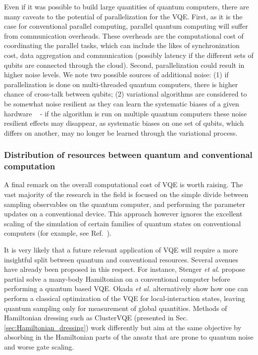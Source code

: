 Even if it was possible to build large quantities of quantum computers, there are many caveats to the potential of parallelization for the VQE. First, as it is the case for conventional parallel computing, parallel quantum computing will suffer from communication overheads. These overheads are the computational cost of coordinating the parallel tasks, which can include the likes of synchronization cost, data aggregation and communication (possibly latency if the different sets of qubits are connected through the cloud). Second, parallelization could result in higher noise levels. We note two possible sources of additional noise: (1) if parallelization is done on multi-threaded quantum computers, there is higher chance of cross-talk between qubits; (2) variational algorithms are considered to be somewhat noise resilient as they can learn the systematic biases of a given hardware ~\cite{mccleanTheoryVariationalHybrid2015, Enrico2021EvaluatingNoiseResilience} - if the algorithm is run on multiple quantum computers these noise resilient effects may disappear, as systematic biases on one set of qubits, which differs on another, may no longer be learned through the variational process. 

\subsubsection{Distribution of resources between quantum and conventional computation} \label{sec:TBD}

A final remark on the overall computational cost of VQE is worth raising. The vast majority of the research in the field is focused on the simple divide between sampling observables on the quantum computer, and performing the parameter updates on a conventional device. This approach however ignores the excellent scaling of the simulation of certain families of quantum states on conventional computers (for example, see Ref.~\cite{Zhou2020}). 

It is very likely that a future relevant application of VQE will require a more insightful split between quantum and conventional resources. Several avenues have already been proposed in this respect. For instance, Stenger \textit{et al.} \cite{Stenger2022} propose partial solve a many-body Hamiltonian on a conventional computer before performing a quantum based VQE. Okada \textit{et al.} \cite{Okada2022} alternatively show how one can perform a classical optimization of the VQE for local-interaction states, leaving quantum sampling only for measurement of global quantities. Methods of Hamiltonian dressing such as ClusterVQE \cite{Zhang2021} (presented in Sec. \ref{sec:Hamiltonian_dressing}) work differently but aim at the same objective by absorbing in the Hamiltonian parts of the ansatz that are prone to quantum noise and worse gate scaling. 


